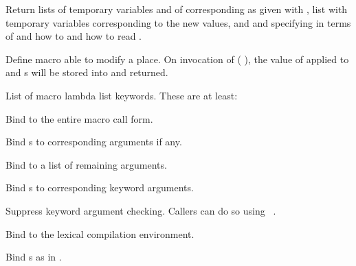 \begin{LIST}{1cm}
  {
    Return lists of temporary variables  and of
    corresponding  as given with ,
    list  with temporary variables
    corresponding to the new values, and 
    and  specifying in terms of 
    and  how to  and how to read
    . 
  }

  {
  Define macro  able to modify a place. On
  invocation of (  ), the value of
   applied to  and s will be stored into
   and returned.
  } 

  {List of macro lambda list keywords. These are at least:
    }
    \begin{LIST}{.5cm}

      {Bind  to the entire macro call form.}

      {Bind s to corresponding arguments if any.}

      {Bind  to a list of remaining arguments.}

      {Bind s to corresponding keyword arguments.}

      {
      Suppress keyword argument checking. Callers can do so using
      ~\T.
      }
      
      {Bind  to the lexical compilation environment.}

      {Bind s as in .}
          
    \end{LIST}
\end{LIST}


